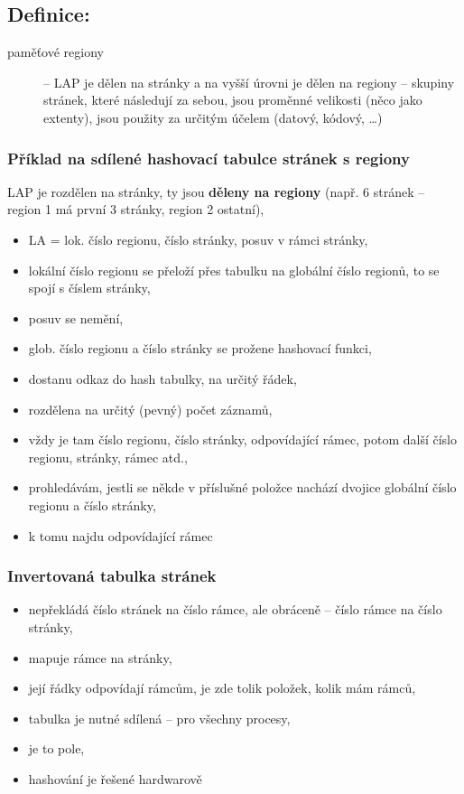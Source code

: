\documentclass[a4paper, 11pt]{article}
\begin{document}
\subsection*{Definice:}
\begin{description}
\item[paměťové regiony] -- LAP je dělen na stránky a na vyšší úrovni je dělen na regiony -- skupiny stránek, které následují za sebou, jsou proměnné velikosti (něco jako extenty), jsou použity za určitým účelem (datový, kódový, \ldots)
\end{description}

\subsubsection{Příklad na sdílené hashovací tabulce stránek s regiony}
LAP je rozdělen na stránky, ty jsou \textbf{děleny na regiony} (např. 6 stránek -- region 1 má první 3 stránky, region 2 ostatní),
\begin{itemize}
    \item LA = lok. číslo regionu, číslo stránky, posuv v rámci stránky,
    \item lokální číslo regionu se přeloží přes tabulku na globální číslo regionů, to se spojí s číslem stránky,
    \item posuv se nemění,
    \item glob. číslo regionu a číslo stránky se prožene hashovací funkci,
    \item dostanu odkaz do hash tabulky, na určitý řádek,
    \item rozdělena na určitý (pevný) počet záznamů, 
    \item vždy je tam číslo regionu, číslo stránky, odpovídající rámec, potom další číslo regionu, stránky, rámec atd.,
    \item prohledávám, jestli se někde v příslušné položce nachází dvojice globální číslo regionu a číslo stránky,
    \item k tomu najdu odpovídající rámec
\end{itemize}

\subsubsection{Invertovaná tabulka stránek}
\begin{itemize}
    \item nepřekládá číslo stránek na číslo rámce, ale obráceně -- číslo rámce na číslo stránky,
    \item mapuje rámce na stránky,
    \item její řádky odpovídají rámcům, je zde tolik položek, kolik mám rámců,
    \item tabulka je nutné sdílená -- pro všechny procesy,
    \item je to pole,
    \item hashování je řešené hardwarově
\end{itemize}
 
\end{document}

